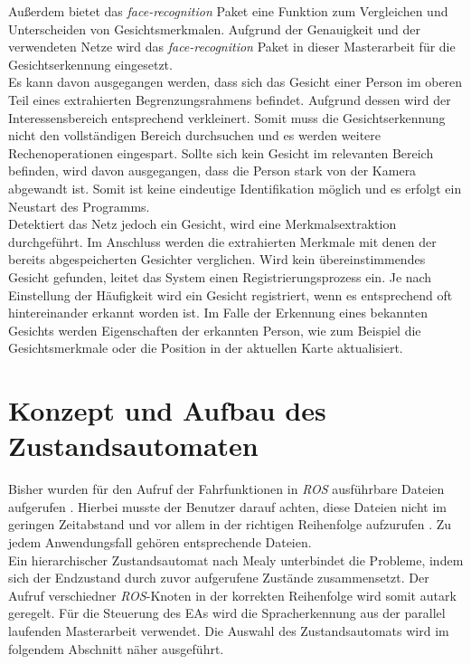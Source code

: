 	Außerdem bietet das \textit{face-recognition} Paket eine Funktion zum Vergleichen und Unterscheiden von Gesichtsmerkmalen. Aufgrund der Genauigkeit und der verwendeten Netze wird das \textit{face-recognition} Paket in dieser Masterarbeit für die Gesichtserkennung eingesetzt.\\
	
	Es kann davon ausgegangen werden, dass sich das Gesicht einer Person im oberen Teil eines extrahierten Begrenzungsrahmens befindet. Aufgrund dessen wird der Interessensbereich entsprechend verkleinert. Somit muss die Gesichtserkennung nicht den vollständigen Bereich durchsuchen und es werden weitere Rechenoperationen eingespart. Sollte sich kein Gesicht im relevanten Bereich befinden, wird davon ausgegangen, dass die Person stark von der Kamera abgewandt ist. Somit ist keine eindeutige Identifikation möglich und es erfolgt ein Neustart des Programms.\\
	
	Detektiert das Netz jedoch ein Gesicht, wird eine Merkmalsextraktion durchgeführt. Im Anschluss werden die extrahierten Merkmale mit denen der bereits abgespeicherten Gesichter verglichen. Wird kein übereinstimmendes Gesicht gefunden, leitet das System einen Registrierungsprozess ein. Je nach Einstellung der Häufigkeit wird ein Gesicht registriert, wenn es entsprechend oft hintereinander erkannt worden ist. Im Falle der Erkennung eines bekannten Gesichts werden Eigenschaften der erkannten Person, wie zum Beispiel die Gesichtsmerkmale oder die Position in der aktuellen Karte aktualisiert. \\ 
	
		
	\section{Konzept und Aufbau des Zustandsautomaten}
	\label{sec: Umsetzung der Statemachine}
	Bisher wurden für den Aufruf der Fahrfunktionen in \textit{ROS} ausführbare Dateien aufgerufen \cite{Bachelorarbeit}. Hierbei musste der Benutzer darauf achten, diese Dateien nicht im geringen Zeitabstand und vor allem in der richtigen Reihenfolge aufzurufen \cite{Bachelorarbeit}. Zu jedem Anwendungsfall gehören entsprechende Dateien. \\
	
	Ein hierarchischer Zustandsautomat nach Mealy unterbindet die Probleme, indem sich der Endzustand durch zuvor aufgerufene Zustände zusammensetzt. Der Aufruf verschiedner \textit{ROS}-Knoten in der korrekten Reihenfolge wird somit autark geregelt. Für die Steuerung des EAs wird die Spracherkennung aus der parallel laufenden Masterarbeit verwendet. Die Auswahl des Zustandsautomats wird im folgendem Abschnitt näher ausgeführt.\\	
	

